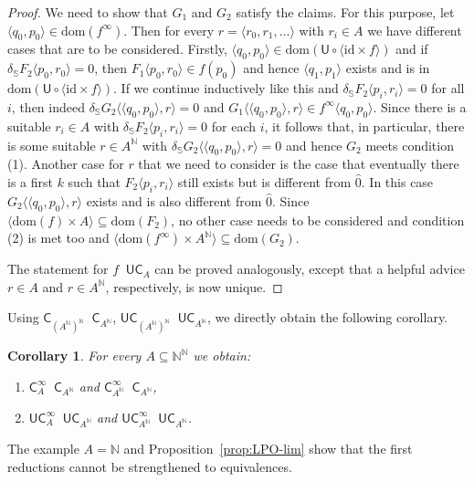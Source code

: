 \documentclass[11pt,a4paper]{amsart}
\theoremstyle{plain}
\newtheorem{cor}[thm]{Corollary}
\theoremstyle{definition}
\theoremstyle{defC}
\theoremstyle{thmC}
\theoremstyle{plain}
\numberwithin{equation}{section}
\def\IN{{\mathbb{N}}}
\def\IS{{\mathbb{S}}}
\def\In{\subseteq}
\def\U{{\mathsf{{U}}}}
\def\C{{\mathsf{{C}}}}
\def\C{\mathsf{C}}
\def\leqW{\mathop{\leq_{\mathrm{W}}}}
\def\equivW{\mathop{\equiv_{\mathrm{W}}}}
\def\equivSW{\mathop{\equiv_{\mathrm{sW}}}}
\def\leqW{\mathop{\leq_{\mathrm{W}}}}
\def\equivW{\mathop{\equiv_{\mathrm{W}}}}
\def\equivSW{\mathop{\equiv_{\mathrm{sW}}}}
\def\id{{\mathrm{id}}}
\def\dom{{\mathrm{dom}}}
\begin{document}
\begin{proof}
\noindent
We need to show that $G_1$ and $G_2$ satisfy the claims. For this purpose, let $\langle q_0,p_0\rangle\in\dom(f^\infty)$.
Then for every $r=\langle r_0,r_1,...\rangle$ with $r_i\in A$  we have different cases that are to be considered.
Firstly, $\langle q_0,p_0\rangle\in\dom(\U\circ\langle\id\times f\rangle)$ and if $\delta_\IS F_2\langle p_0,r_0\rangle=0$, then $F_1\langle p_0,r_0\rangle\in f(p_0)$ and
hence $\langle q_1,p_1\rangle$ exists and is in $\dom(\U\circ\langle\id\times f\rangle)$. If we continue inductively like this and $\delta_\IS F_2\langle p_i,r_i\rangle=0$
for all $i$, then indeed $\delta_\IS G_2\langle\langle q_0,p_0\rangle,r\rangle=0$ and
$G_1\langle\langle q_0,p_0\rangle,r\rangle\in f^\infty\langle q_0,p_0\rangle$.
Since there is a suitable $r_i\in A$ with $\delta_\IS F_2\langle p_i,r_i\rangle=0$ for each $i$, it follows that,
in particular, there is some suitable $r\in A^\IN$ with $\delta_\IS G_2\langle\langle q_0,p_0\rangle,r\rangle=0$
and hence $G_2$ meets condition (1). Another case for $r$ that we need to consider is the case that
eventually there is a first $k$ such that $F_2\langle p_i,r_i\rangle$ still exists but is different from $\widehat{0}$.
In this case $G_2\langle\langle q_0,p_0\rangle,r\rangle$ exists and is also different from $\widehat{0}$.
Since $\langle \dom(f)\times A\rangle\In\dom(F_2)$, no other case needs to be considered and condition (2)
is met too and $\langle \dom(f^\infty)\times A^\IN\rangle\In\dom(G_2)$.

The statement for $f\leqW\U\C_A$ can be proved analogously, except that a helpful advice 
$r\in A$ and $r\in A^\IN$, respectively, is now unique.
\end{proof}

\noindent
Using $\C_{(A^\IN)^\IN}\equivSW\C_{A^\IN}$, $\U\C_{(A^\IN)^\IN}\equivSW\U\C_{A^\IN}$, 
we directly obtain the following corollary.

\begin{cor}
For every $A\In\IN^\IN$ we obtain:
\begin{enumerate}
\item $\C_A^\infty\leqW\C_{A^\IN}$ and $\C_{A^\IN}^\infty\equivW\C_{A^\IN}$,
\item $\U\C_A^\infty\leqW\U\C_{A^\IN}$ and $\U\C_{A^\IN}^\infty\equivW\U\C_{A^\IN}$.
\end{enumerate}
\end{cor}

\noindent
The example $A=\IN$ and Proposition~\ref{prop:LPO-lim} show that the first reductions cannot be strengthened to equivalences.
\end{document}
